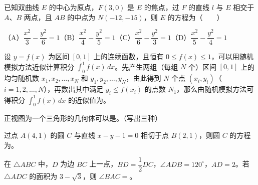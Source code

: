 \begin{question}
已知双曲线 $E$ 的中心为原点，$F(3,0)$ 是 $E$ 的焦点，过 $F$ 的直线 $l$ 与 $E$ 相交于 $A\text{、}B$ 两点，且 $AB$ 的中点为 $N(-12,-15)$，则 $E$ 的方程为\mbox{（　　）}

（A）$\dfrac{x^2}{3}-\dfrac{y^2}{6}=1$\quad（B）$\dfrac{x^2}{4}-\dfrac{y^2}{5}=1$\quad（C）$\dfrac{x^2}{6}-\dfrac{y^2}{3}=1$\quad（D）$\dfrac{x^2}{5}-\dfrac{y^2}{4}=1$

\end{question}

\begin{question}
设 $y=f(x)$ 为区间 $[0,1]$ 上的连续函数，且恒有 $0\leq f(x)\leq1$，可以用随机模拟方法近似计算积分 $\displaystyle\int_0^1f(x)\,dx$。先产生两组（每组 $N$ 个）区间 $[0,1]$ 上的均匀随机数 $x_1,x_2,\ldots,x_N$ 和 $y_1,y_2,\ldots,y_N$，由此得到 $N$ 个点 $(x_i,y_i)$（$i=1,2,\ldots,N$），再数出其中满足 $y_i\leq f(x_i)$ 的点数 $N_1$，那么由随机模拟方法可得积分 $\displaystyle\int_0^1f(x)\,dx$ 的近似值为\gkblank{}。

\end{question}
\begin{question}
正视图为一个三角形的几何体可以是\gkblank{}。（写出三种）

\end{question}
\begin{question}
过点 $A(4,1)$ 的圆 $C$ 与直线 $x-y-1=0$ 相切于点 $B(2,1)$，则圆 $C$ 的方程为\gkblank{}。

\end{question}
\begin{question}
在 $\triangle ABC$ 中，$D$ 为边 $BC$ 上一点，$BD=\dfrac12DC$，$\angle ADB=120^\circ$，$AD=2$。若 $\triangle ADC$ 的面积为 $3-\sqrt3$，则 $\angle BAC=$\gkblank{}。

\end{question}

